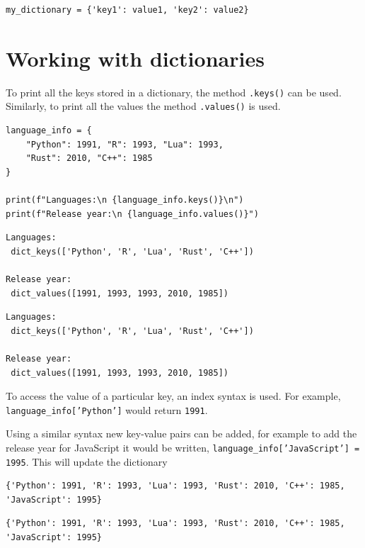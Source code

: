 \documentclass[10pt]{book}
\begin{document}
\label{org2f40f1b}
\begin{verbatim}
my_dictionary = {'key1': value1, 'key2': value2}
\end{verbatim}
\section{Working with dictionaries}
\label{sec:org6c995a5}
To print all the keys stored in a dictionary, the method \texttt{.keys()} can be used. Similarly, to print all the values the method \texttt{.values()} is used.

\label{orgaf86c3f}
\begin{verbatim}
language_info = {
    "Python": 1991, "R": 1993, "Lua": 1993,
    "Rust": 2010, "C++": 1985
}

print(f"Languages:\n {language_info.keys()}\n")
print(f"Release year:\n {language_info.values()}")
\end{verbatim}

\label{orgf6c0488}
\begin{verbatim}
Languages:
 dict_keys(['Python', 'R', 'Lua', 'Rust', 'C++'])

Release year:
 dict_values([1991, 1993, 1993, 2010, 1985])
\end{verbatim}

\label{org6c13892}
\begin{verbatim}
Languages:
 dict_keys(['Python', 'R', 'Lua', 'Rust', 'C++'])

Release year:
 dict_values([1991, 1993, 1993, 2010, 1985])
\end{verbatim}

To access the value of a particular key, an index syntax is used. For example, \texttt{language\_info['Python']} would return \texttt{1991}.

Using a similar syntax new key-value pairs can be added, for example to add the release year for JavaScript it would be written, \texttt{language_info['JavaScript'] = 1995}. This will update the dictionary

\label{orgc2dfdaf}
\label{org1f21d44}
\begin{verbatim}
{'Python': 1991, 'R': 1993, 'Lua': 1993, 'Rust': 2010, 'C++': 1985, 'JavaScript': 1995}
\end{verbatim}

\label{org217e633}
\begin{verbatim}
{'Python': 1991, 'R': 1993, 'Lua': 1993, 'Rust': 2010, 'C++': 1985, 'JavaScript': 1995}
\end{verbatim}
\end{document}

